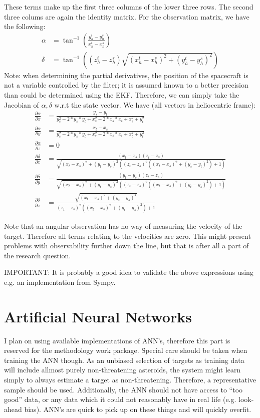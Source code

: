 \documentclass[a4paper,10pt]{article}
\begin{document}
These terms make up the first three columns of the lower three rows. The second three colums are again the identity matrix. For the observation matrix, we have the following:
\begin{align}
 \alpha &= \tan ^{-1} \left( \frac{ y_h^t - y_h^s}{x_h^t - x_h^s}\right) \\
 \delta &= \tan^{-1}\left(\left(z_h^t - z_h^s\right)\sqrt{\left(x_h^t - x_h^s\right)^2 + \left(y_h^t - y_h^s\right)^2}\right)
\end{align}
Note: when determining the partial derivatives, the position of the spacecraft is not a variable controlled by the filter; it is assumed known to a better precision than could be determined using the EKF. Therefore, we can simply take the Jacobian of $\alpha, \delta$ w.r.t the state vector. We have (all vectors in heliocentric frame):
\begin{align}
 \frac{\partial \alpha}{\partial x} &= \frac{y_s - y_t}{y_s^2 - 2*y_s*y_t + x_s^2 - 2*x_s*x_t + x_t^2 + y_t^2} \\
 \frac{\partial \alpha}{\partial y} &= \frac{x_t - x_s}{y_s^2 - 2*y_s*y_t + x_s^2 - 2*x_s*x_t + x_t^2 + y_t^2} \\
 \frac{\partial \alpha}{\partial z} &= 0 \\
 \frac{\partial \delta}{\partial x} &= \frac{(x_t - x_s)(z_t-z_s)}{\sqrt{(x_t - x_s)^2 + (y_t - y_s)^2}\left((z_t - z_s)^2 \left((x_t - x_s)^2 + (y_s - y_t)^2\right) + 1 \right)} \\
 \frac{\partial \delta}{\partial y} &= \frac{(y_t - y_s)(z_t - z_s)}{\sqrt{(x_t - x_s)^2 + (y_t - y_s)^2}\left( (z_t - z_s)^2 \left( ( x_t - x_s)^2 + (y_t - y_s)^2\right) + 1 \right)}\\
 \frac{\partial \delta}{\partial z} &= \frac{\sqrt{(x_t - x_s)^2 + (y_t - y_s)^2}}{(z_t - z_s)^2\left( ( x_t - x_s)^2 + (y_t - y_s)^2\right) + 1}
\end{align}

Note that an angular observation has no way of measuring the velocity of the target. Therefore all terms relating to the velocities are zero. This might present problems with observability further down the line, but that is after all a part of the research question.

IMPORTANT: It is probably a good idea to validate the above expressions using e.g. an implementation from Sympy.


\section{Artificial Neural Networks}

I plan on using available implementations of ANN's, therefore this part is reserved for the methodology work package. Special care should be taken when training the ANN though. As an unbiased selection of targets as training data will include allmost purely non-threatening asteroids, the system might learn simply to always estimate a target as non-threatening. Therefore, a representative sample should be used. Additionally, the ANN should not have access to ``too good'' data, or any data which it could not reasonably have in real life (e.g. look-ahead bias). ANN's are quick to pick up on these things and will quickly overfit.
\end{document}
